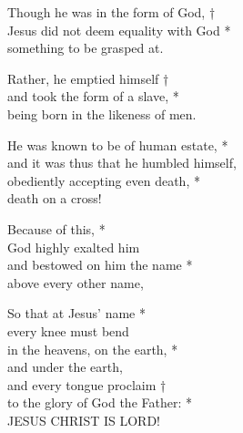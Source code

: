 
Though he was in the form of God, †\\
Jesus did not deem equality with God *\\
something to be grasped at.

Rather, he emptied himself †\\
and took the form of a slave, *\\
being born in the likeness of men.

He was known to be of human estate, *\\
and it was thus that he humbled himself,\\
obediently accepting even death, *\\
death on a cross!

Because of this, *\\
God highly exalted him\\
and bestowed on him the name *\\
above every other name,

So that at Jesus' name *\\
every knee must bend\\
in the heavens, on the earth, *\\
and under the earth,\\
and every tongue proclaim †\\
to the glory of God the Father: *\\
JESUS CHRIST IS LORD!
